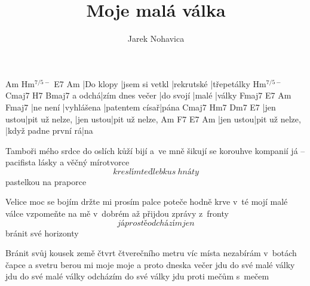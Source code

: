 \documentclass{song}
\author{Jarek Nohavica}
\title{Moje malá válka}
\renewcommand{\-}{$^{7/5-}$}
\begin{document}
\strophe
Am        Hm\-           E7         Am
|Do klopy |jsem si vetkl |rekrutské |třepetálky
	   Hm\-            Cmaj7     H7    Bmaj7
a odchá|zím dnes večer |do svojí |malé |války
Fmaj7    E7         Am             Fmaj7
|ne není |vyhlášena |patentem císař|pána
Cmaj7     Hm7            Dm7       E7
|jen ustou|pit už nelze, |jen ustou|pit už nelze,
Am        F7             E7                  Am
|jen ustou|pit už nelze, |když padne první rá|na
\endstrophe

\strophe*
Tamboři mého srdce do oslích kůží bijí
a~ve mně šikují se korouhve kompanií
já -- pacifista lásky a věčný mírotvorce
\[ kreslím teď lebku s~hnáty \] pastelkou na praporce
\endstrophe

\strophe*
Velice moc se bojím držte mi prosím palce
poteče hodně krve v~té mojí malé válce
vzpomeňte na mě v~dobrém až přijdou zprávy z~fronty
\[ já prostě odcházím jen \] bránit své horizonty
\endstrophe

\strophe*
Bránit svůj kousek země čtvrt čtverečního metru
víc místa nezabírám v~botách čapce a svetru
berou mi moje moje a proto dneska večer
jdu do své malé války jdu do své malé války
odcházím do své války jdu proti mečům s~mečem
\endstrophe

\end{document}
